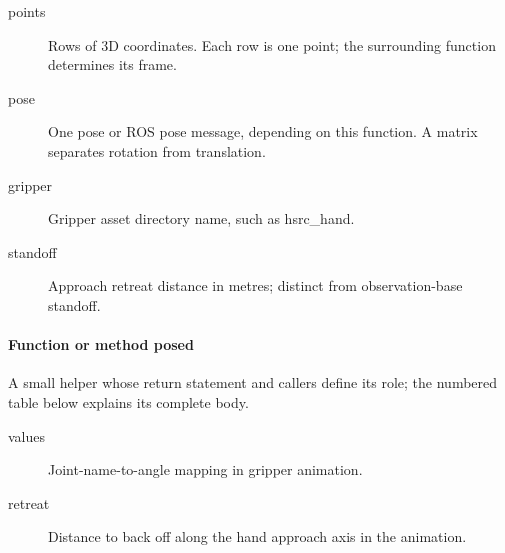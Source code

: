 \documentclass[11pt,a4paper]{book}
\begin{document}
\begin{description}
\item[points] Rows of 3D coordinates. Each row is one point; the surrounding function determines its frame.
\item[pose] One pose or ROS pose message, depending on this function. A matrix separates rotation from translation.
\item[gripper] Gripper asset directory name, such as hsrc\_hand.
\item[standoff] Approach retreat distance in metres; distinct from observation-base standoff.
\end{description}

\paragraph{Function or method posed}
A small helper whose return statement and callers define its role; the numbered table below explains its complete body.

\begin{description}
\item[values] Joint-name-to-angle mapping in gripper animation.
\item[retreat] Distance to back off along the hand approach axis in the animation.
\end{description}
\end{document}
